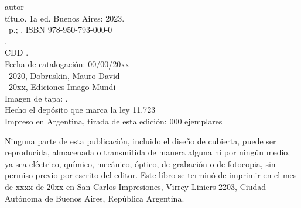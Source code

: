 \noindent autor \\
\noindent título. 1a ed. Buenos Aires: 2023.\\
\noindent \ztotpages\ p.; \valorEspecifico. ISBN 978-950-793-000-0 \\
. \\
\noindent CDD .\\
\noindent Fecha de catalogación: 00/00/20xx \\
\noindent \textcopyright~2020, Dobruskin, Mauro David  \\
\noindent \textcopyright~20xx, Ediciones Imago Mundi\\
\noindent Imagen de tapa: .\\
\noindent Hecho el depósito que marca la ley 11.723\\
\noindent Impreso en Argentina, tirada de esta edición: 000 ejemplares\\

\vfill

\noindent {}\bigskip

\noindent Ninguna parte de esta publicación, incluido el diseño de cubierta, puede ser reproducida, almacenada o transmitida de manera alguna ni por ningún medio, ya sea eléctrico, químico, mecánico, óptico, de grabación o de fotocopia, sin permiso previo por escrito del editor. Este libro se terminó de imprimir en el mes de xxxx de 20xx en San Carlos Impresiones, Virrey Liniers 2203, Ciudad Autónoma de Buenos Aires, República Argentina.

